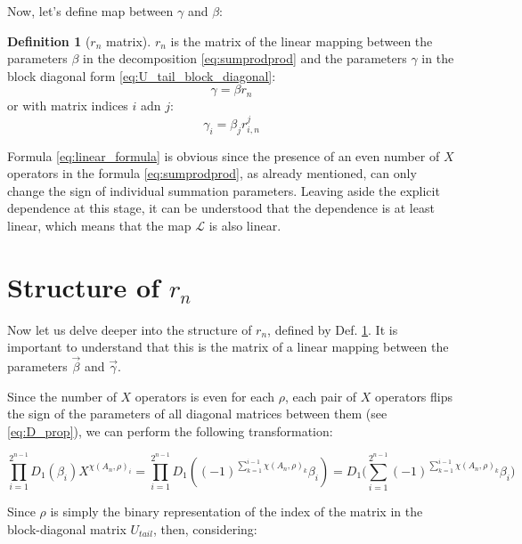 \documentclass[a4paper, openany, 12pt]{article}
\theoremstyle{remark}
\theoremstyle{definition}
\newtheorem{definition}{Definition}[section]
\begin{document}
Now, let's define map between $\gamma$ and $\beta$:

\begin{definition}[$r_n$ matrix]
\label{def:r}
$r_n$ is the matrix of the linear mapping between the parameters $\beta$ in the decomposition \eqref{eq:sumprodprod} and the parameters $\gamma$ in the block diagonal form \eqref{eq:U_tail_block_diagonal}:
    \begin{equation}
\gamma= \beta r_n
\label{eq:linear_formula}
    \end{equation}
or with matrix indices $i$ adn $j$:
    \begin{equation}
    \gamma_i = \beta_j    r_{i,n}^j
    \end{equation}
\end{definition}

Formula \eqref{eq:linear_formula} is obvious since the presence of an even number of $X$ operators in the formula \eqref{eq:sumprodprod}, as already mentioned, can only change the sign of individual summation parameters. Leaving aside the explicit dependence at this stage, it can be understood that the dependence is at least linear, which means that the map $\mathcal{L}$ is also linear.


\section{Structure of $r_n$
\label{sec:r_formula}}


Now let us delve deeper into the structure of $r_n$, defined by Def. \ref{def:r}. It is important to understand that this is the matrix of a linear mapping between the parameters $\vec{\beta}$ and $\vec{\gamma}$.


Since the number of $X$ operators is even for each $\rho$, each pair of $X$ operators flips the sign of the parameters of all diagonal matrices between them (see \eqref{eq:D_prop}), we can perform the following transformation:

\begin{equation}
    \prod_{i=1}^{2^{n-1}} D_1(\beta_i)X^{\chi(A_n,\rho)_i} = \prod_{i=1}^{2^{n-1}} D_1((-1)^{\sum_{k = 1}^{i-1}\chi(A_n,\rho)_k}\beta_i) = D_1\bigg(\sum_{i=1}^{2^{n-1}}(-1)^{\sum_{k = 1}^{i-1}\chi(A_n,\rho)_k}\beta_i \bigg)
\end{equation}

Since $\rho$ is simply the binary representation of the index of the matrix in the block-diagonal matrix $U_{tail}$, then, considering:
\end{document}
